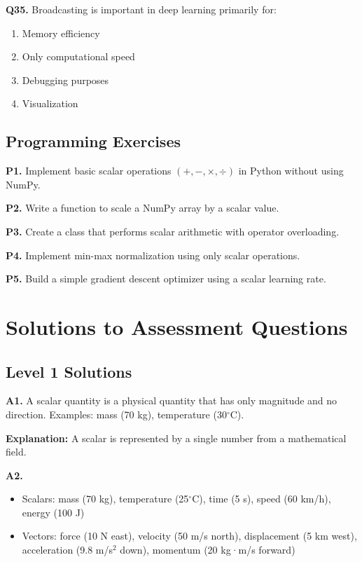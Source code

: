 \documentclass[11pt,a4paper]{article}
\begin{document}
\textbf{Q35.} Broadcasting is important in deep learning primarily for:
\begin{enumerate}[label=(\alph*)]
    \item Memory efficiency
    \item Only computational speed
    \item Debugging purposes
    \item Visualization
\end{enumerate}

\subsection{Programming Exercises}

\textbf{P1.} Implement basic scalar operations $(+, -, \times, \div)$ in Python without using NumPy.

\textbf{P2.} Write a function to scale a NumPy array by a scalar value.

\textbf{P3.} Create a class that performs scalar arithmetic with operator overloading.

\textbf{P4.} Implement min-max normalization using only scalar operations.

\textbf{P5.} Build a simple gradient descent optimizer using a scalar learning rate.

\section{Solutions to Assessment Questions}

\subsection{Level 1 Solutions}

\textbf{A1.} A scalar quantity is a physical quantity that has only magnitude and no direction. Examples: mass (70 kg), temperature (30$^\circ$C).

\textbf{Explanation:} A scalar is represented by a single number from a mathematical field.

\textbf{A2.} 
\begin{itemize}
    \item Scalars: mass (70 kg), temperature (25$^\circ$C), time (5 s), speed (60 km/h), energy (100 J)
    \item Vectors: force (10 N east), velocity (50 m/s north), displacement (5 km west), acceleration (9.8 m/s$^2$ down), momentum (20 kg·m/s forward)
\end{itemize}
\end{document}
